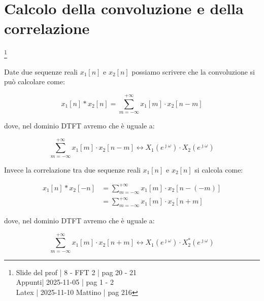 \newpage 

\section{Calcolo della convoluzione e della correlazione}

\footnote{ 
    Slide del prof | 8 - FFT 2 | pag 20 - 21\\
    Appunti| 2025-11-05 | pag 1 - 2  \\ 
    Latex | 2025-11-10 Mattino | pag 216 
} 

Date due sequenze reali $x_1 \left[ n\right]$ e $x_2 \left[ n\right]$ possiamo scrivere che la convoluzione si può calcolare come: 

{
    \Large 
    \begin{equation}
        x_1 \left[ n\right] * x_2 \left[ n\right] 
        = 
        \sum_{m = -\infty}^{+ \infty}
        x_1 \left[ m\right] 
        \cdot 
        x_2 \left[ n - m\right]  
    \end{equation}
}

dove, nel dominio DTFT avremo che è uguale a: 

{
    \Large 
    \begin{equation} 
        \sum_{m = -\infty}^{+ \infty}
        x_1 \left[ m\right] 
        \cdot 
        x_2 \left[ n - m\right]
        \leftrightarrow 
        X_1 \left(e^{\jmath \omega}\right)
        \cdot  
        X_2 \left(e^{\jmath \omega}\right)
    \end{equation}
}

Invece la correlazione tra due sequenze reali $x_1 \left[ n\right]$ e $x_2 \left[ n\right]$ si calcola come: 

{
    \Large 
    \begin{equation}
        \begin{split}
        x_1 \left[ n\right] * x_2 \left[ -n\right] 
        &= 
        \sum_{m = -\infty}^{+ \infty}
        x_1 \left[ m\right] 
        \cdot 
        x_2 \left[ n - \left(-m\right)\right]
        \\
        &=
        \sum_{m = -\infty}^{+ \infty}
        x_1 \left[ m\right] 
        \cdot 
        x_2 \left[ n + m\right]       
        \end{split}
        \end{equation}
}

dove, nel dominio DTFT avremo che è uguale a: 

{
    \Large 
    \begin{equation} 
        \sum_{m = -\infty}^{+ \infty}
        x_1 \left[ m\right] 
        \cdot 
        x_2 \left[ n + m\right]
        \leftrightarrow 
        X_1 \left(e^{\jmath \omega}\right)
        \cdot  
        X_2^{*} \left(e^{\jmath \omega}\right)
    \end{equation}
}

